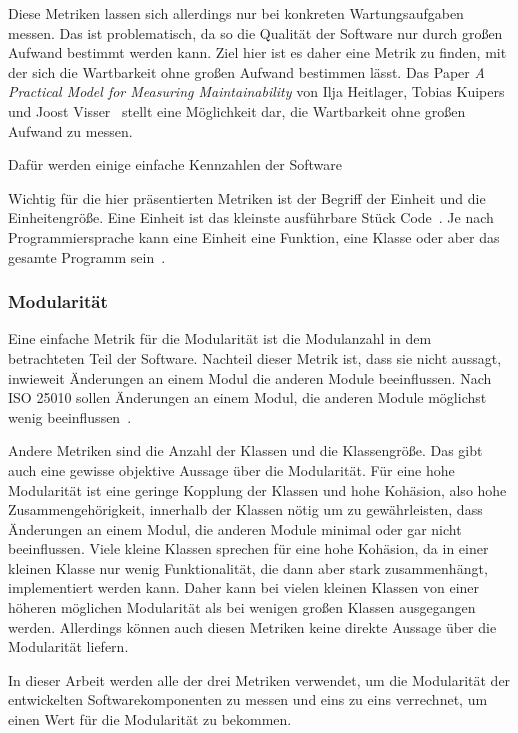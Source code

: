 \documentclass[12pt, a4paper, ngerman]{article}
\begin{document}
Diese Metriken lassen sich allerdings nur bei konkreten Wartungsaufgaben messen.
Das ist problematisch, da so die Qualität der Software nur durch großen Aufwand bestimmt werden kann.
Ziel hier ist es daher eine Metrik zu finden, mit der sich die Wartbarkeit ohne großen Aufwand bestimmen lässt.
Das Paper \emph{A Practical Model for Measuring Maintainability} von Ilja Heitlager, Tobias Kuipers und Joost Visser~\cite{maintainability_metrics}
stellt eine Möglichkeit dar, die Wartbarkeit ohne großen Aufwand zu messen.

Dafür werden einige einfache Kennzahlen der Software 



Wichtig für die hier präsentierten Metriken ist der Begriff der Einheit und die Einheitengröße.
Eine Einheit ist das kleinste ausführbare Stück Code~\cite{maintainability_metrics}.
Je nach Programmiersprache kann eine Einheit eine Funktion, eine Klasse oder aber das gesamte Programm sein~\cite{maintainability_metrics}.

\subsubsection{Modularität}

Eine einfache Metrik für die Modularität ist die Modulanzahl
in dem betrachteten Teil der Software.
Nachteil dieser Metrik ist, dass sie nicht aussagt,
inwieweit Änderungen an einem Modul die anderen Module beeinflussen.
Nach ISO 25010 sollen Änderungen an einem Modul,
die anderen Module möglichst wenig beeinflussen~\cite{ISO25010}.

Andere Metriken sind die Anzahl der Klassen und die Klassengröße.
Das gibt auch eine gewisse objektive Aussage über die Modularität.
Für eine hohe Modularität ist eine geringe Kopplung der Klassen und
hohe Kohäsion, also hohe Zusammengehörigkeit, innerhalb der Klassen nötig um zu gewährleisten,
dass Änderungen an einem Modul, die anderen Module minimal oder gar nicht beeinflussen.
Viele kleine Klassen sprechen für eine hohe Kohäsion,
da in einer kleinen Klasse nur wenig Funktionalität,
die dann aber stark zusammenhängt, implementiert werden kann.
Daher kann bei vielen kleinen Klassen von einer höheren möglichen Modularität
als bei wenigen großen Klassen ausgegangen werden.
Allerdings können auch diesen Metriken keine direkte Aussage über die Modularität liefern.

In dieser Arbeit werden alle der drei Metriken verwendet,
um die Modularität der entwickelten Softwarekomponenten zu messen
und eins zu eins verrechnet, um einen Wert für die Modularität zu bekommen.
\end{document}
